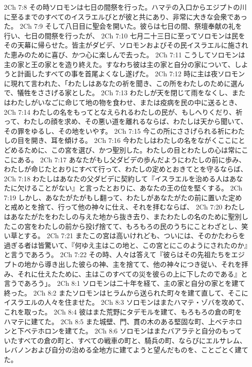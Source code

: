 2Ch 7:8  その時ソロモンは七日の間祭を行った。ハマテの入口からエジプトの川に至るまでのすべてのイスラエルびとが彼と共にあり、非常に大きな会衆であった。
2Ch 7:9  そして八日目に聖会を開いた。彼らは七日の間、祭壇奉献の礼を行い、七日の間祭を行ったが、
2Ch 7:10  七月二十三日に至ってソロモンは民をその天幕に帰らせた。皆主がダビデ、ソロモンおよびその民イスラエルに施された恵みのために喜び、かつ心に楽しんで去った。
2Ch 7:11  こうしてソロモンは主の家と王の家とを造り終えた。すなわち彼は主の家と自分の家について、しようと計画したすべての事を首尾よくなし遂げた。
2Ch 7:12  時に主は夜ソロモンに現れて言われた、「わたしはあなたの祈を聞き、この所をわたしのために選んで、犠牲をささげる家とした。
2Ch 7:13  わたしが天を閉じて雨をなくし、またはわたしがいなごに命じて地の物を食わせ、または疫病を民の中に送るとき、
2Ch 7:14  わたしの名をもってとなえられるわたしの民が、もしへりくだり、祈って、わたしの顔を求め、その悪い道を離れるならば、わたしは天から聞いて、その罪をゆるし、その地をいやす。
2Ch 7:15  今この所にささげられる祈にわたしの目を開き、耳を傾ける。
2Ch 7:16  今わたしはわたしの名をながくここにとどめるために、この宮を選び、かつ聖別した。わたしの目とわたしの心は常にここにある。
2Ch 7:17  あなたがもし父ダビデの歩んだようにわたしの前に歩み、わたしが命じたとおりにすべて行って、わたしの定めとおきてとを守るならば、
2Ch 7:18  わたしはあなたの父ダビデに契約して『イスラエルを治める人はあなたに欠けることがない』と言ったとおりに、あなたの王の位を堅くする。
2Ch 7:19  しかし、あなたがたがもし翻って、わたしがあなたがたの前に置いた定めと戒めとを捨て、行って他の神々に仕え、それを拝むならば、
2Ch 7:20  わたしはあなたがたをわたしの与えた地から抜き去り、またわたしの名のために聖別したこの宮をわたしの前から投げ捨てて、もろもろの民のうちにことわざとし、笑い草とする。
2Ch 7:21  またこの宮は高いけれども、ついには、そのかたわらを過ぎる者は皆驚いて、『何ゆえ主はこの地と、この宮とにこのようにされたのか』と言うであろう。
2Ch 7:22  その時、人々は答えて『彼らはその先祖たちをエジプトの地から導き出した彼らの神、主を捨てて、他の神々につき従い、それを拝み、それに仕えたために、主はこのすべての災を彼らの上に下したのである』と言うであろう」。
2Ch 8:1  ソロモンは二十年を経て、主の家と自分の家とを建て終った。
2Ch 8:2  またソロモンはヒラムから送られた町々を建て直して、そこにイスラエルの人々を住ませた。
2Ch 8:3  ソロモンはまたハマテ・ゾバを攻めて、これを取った。
2Ch 8:4  彼はまた荒野にタデモルを建て、もろもろの倉の町をハマテに建てた。
2Ch 8:5  また城壁、門、貫の木のある堅固な町、上ベテホロンと下ベテホロンを建てた。
2Ch 8:6  ソロモンはまたバアラテと自分のもっていたすべての倉の町と、すべての戦車の町と、騎兵の町、ならびにエルサレム、レバノンおよび自分の治める全地方に建てようと望んだものを、ことごとく建てた。
